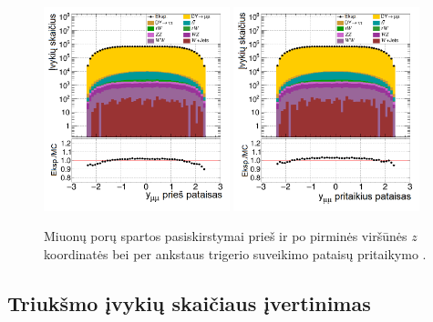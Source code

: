 \documentclass[a4paper, 12pt, oneside]{article}
\begin{document}
\begin{figure}[b!]
	\includegraphics[width=0.48\textwidth]{Kursinis3/mumu_rapi_beforePVz.png}
	\includegraphics[width=0.48\textwidth]{Kursinis3/mumu_rapi_after.png}
	\vspace{-0.5cm}
	\caption{\label{fig:rapiba} Miuonų porų spartos pasiskirstymai prieš ir po pirminės viršūnės $z$ koordinatės bei per ankstaus
	trigerio suveikimo pataisų pritaikymo \cite{MAk2}.}
\end{figure}

\subsection{Triukšmo įvykių skaičiaus įvertinimas}\label{sec:FRresults}
\end{document}
